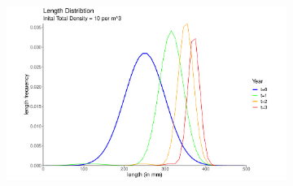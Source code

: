 \documentclass[11pt,oneside]{amsart}
\theoremstyle{definition}
\begin{document}
\begin{figure}
\begin{subfigure}[b]{.3\textwidth}
     \caption{}
\label{}
\end{subfigure}
\begin{subfigure}[b]{.3\textwidth}
   \includegraphics[width=\textwidth]{figures/Figure4i.pdf}
     \caption{}
\label{}  
\end{subfigure} 
\caption{}
\end{figure}    
\end{document}
